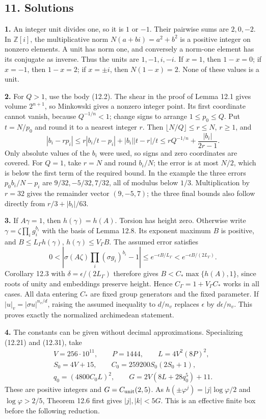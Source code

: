 \documentclass[
  11pt,
  a4paper,
]{article}
\begin{document}
\subsection{11. Solutions}\label{solutions}

\textbf{1.} An integer unit divides one, so it is \(1\) or \(-1\). Their
pairwise sums are \(2,0,-2\). In \(\mathbb Z[i]\), the multiplicative
norm \(N(a+bi)=a^2+b^2\) is a positive integer on nonzero elements. A
unit has norm one, and conversely a norm-one element has its conjugate
as inverse. Thus the units are \(1,-1,i,-i\). If \(x=1\), then
\(1-x=0\); if \(x=-1\), then \(1-x=2\); if \(x=\pm i\), then
\(N(1-x)=2\). None of these values is a unit.

\textbf{2.} For \(Q>1\), use the body (12.2). The shear in the proof of
Lemma 12.1 gives volume \(2^{n+1}\), so Minkowski gives a nonzero
integer point. Its first coordinate cannot vanish, because
\(Q^{-1/n}<1\); change signs to arrange \(1\le p_0\le Q\). Put
\(t=N/p_0\) and round it to a nearest integer \(r\). Then
\(\lfloor N/Q\rfloor\le r\le N\), \(r\ge1\), and \[
|b_i-rp_i|
\le r|b_i/t-p_i|+|b_i||t-r|/t
\le rQ^{-1/n}+\frac{|b_i|}{2r-1}.
\] Only absolute values of the \(b_i\) were used, so signs and zero
coordinates are covered. For \(Q=1\), take \(r=N\) and round \(b_i/N\);
the error is at most \(N/2\), which is below the first term of the
required bound. In the example the three errors \(p_0b_i/N-p_i\) are
\(9/32,-5/32,7/32\), all of modulus below \(1/3\). Multiplication by
\(r=32\) gives the remainder vector \((9,-5,7)\); the three final bounds
also follow directly from \(r/3+|b_i|/63\).

\textbf{3.} If \(A\gamma=1\), then \(h(\gamma)=h(A)\). Torsion has
height zero. Otherwise write \(\gamma=\zeta\prod_i g_i^{b_i}\) with the
basis of Lemma 12.8. Its exponent maximum \(B\) is positive, and
\(B\le L_\Gamma h(\gamma)\), \(h(\gamma)\le V_\Gamma B\). The assumed
error satisfies \[
0<\left|\sigma(A\zeta)\prod_i(\sigma g_i)^{b_i}-1\right|
\le e^{-\epsilon B/L_\Gamma}
<e^{-\epsilon B/(2L_\Gamma)}.
\] Corollary 12.3 with \(\delta=\epsilon/(2L_\Gamma)\) therefore gives
\(B<C_*\max\{h(A),1\}\), since roots of unity and embeddings preserve
height. Hence \(C_\Gamma=1+V_\Gamma C_*\) works in all cases. All data
entering \(C_*\) are fixed group generators and the fixed parameter. If
\(|u|_v=|\sigma u|^{n_v/d}\), raising the assumed inequality to
\(d/n_v\) replaces \(\epsilon\) by \(d\epsilon/n_v\). This proves
exactly the normalized archimedean statement.

\textbf{4.} The constants can be given without decimal approximations.
Specializing (12.21) and (12.31), take \[
\begin{gathered}
V=256\cdot10^{11},\qquad P=1444,\qquad L=4V^2(8P)^2,\\
S_0=4V+15,\qquad C_0=259200S_0(2S_0+1),\\
q_0=(4800C_0L)^2,\qquad
G=2V(8L+28q_0^5)+11.
\end{gathered}
\tag{12.65}
\] These are positive integers and \(G=C_{\rm unit}(2,5)\). As
\(h(\pm\varphi^j)=|j|\log\varphi/2\) and \(\log\varphi>2/5\), Theorem
12.6 first gives \(|j|,|k|<5G\). This is an effective finite box before
the following reduction.
\end{document}
